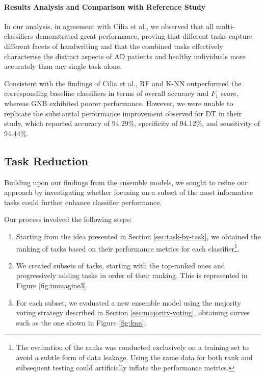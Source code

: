 \documentclass[a4paper, 11pt]{article}
\begin{document}
\vspace{-15pt}

\paragraph{Results Analysis and Comparison with Reference Study}
In our analysis, in agreement with Cilia et al., we observed that all multi-classifiers demonstrated great performance, proving that different tasks capture different facets of handwriting and that the combined tasks effectively characterise the distinct aspects of AD patients and healthy individuals more accurately than any single task alone.

Consistent with the findings of Cilia et al., RF and K-NN outperformed the corresponding baseline classifiers in terms of overall accuracy and $F_1$ score, whereas GNB exhibited poorer performance. However, we were unable to replicate the substantial performance improvement observed for DT in their study, which reported accuracy of 94.29\%, specificity of 94.12\%, and sensitivity of 94.44\%.

\subsection{Task Reduction} \label{sec:task-reduction}
Building upon our findings from the ensemble models, we sought to refine our approach by investigating whether focusing on a subset of the most informative tasks could further enhance classifier performance. 

Our process involved the following steps: \begin{enumerate} \item Starting from the idea presented in Section \ref{sec:task-by-task}, we obtained the ranking of tasks based on their performance metrics for each classifier\footnote{The evaluation of the ranks was conducted exclusively on a training set to avoid a subtle form of data leakage. Using the same data for both rank and subsequent testing could artificially inflate the performance metrics.}. \item We created subsets of tasks, starting with the top-ranked ones and progressively adding tasks in order of their ranking. This is represented in Figure \ref{fig:immagine3}. \item For each subset, we evaluated a new ensemble model using the majority voting strategy described in Section \ref{sec:majority-voting}, obtaining curves such as the one shown in Figure \ref{fig:knn}. \end{enumerate}
\end{document}
